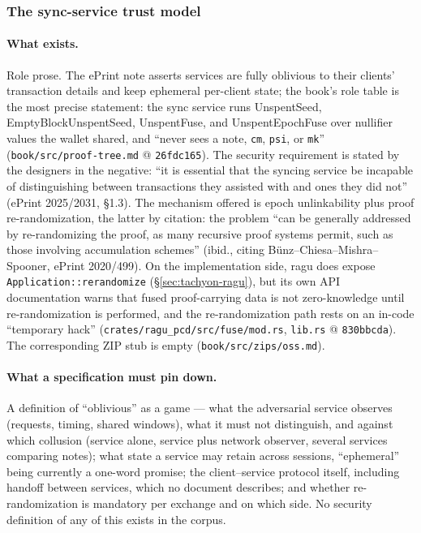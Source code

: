\documentclass[11pt,a4paper]{article}
\theoremstyle{definition}
\begin{document}
\subsubsection{The sync-service trust model}\label{sec:tachyon-dbu-oss}

\paragraph{What exists.} Role prose. The ePrint note asserts services are
fully oblivious to their clients' transaction details and keep ephemeral
per-client state; the book's role table is the most precise statement: the
sync service runs \textsf{UnspentSeed}, \textsf{EmptyBlockUnspentSeed},
\textsf{UnspentFuse}, and \textsf{UnspentEpochFuse} over nullifier values
the wallet shared, and ``never sees a note, \texttt{cm}, \texttt{psi}, or
\texttt{mk}'' (\texttt{book/src/proof-tree.md} @ \texttt{26fdc165}). The
security requirement is stated by the designers in the negative: ``it is
essential that the syncing service be incapable of distinguishing between
transactions they assisted with and ones they did not'' (ePrint 2025/2031,
\S1.3). The mechanism offered is epoch unlinkability plus proof
re-randomization, the latter by citation: the problem ``can be generally
addressed by re-randomizing the proof, as many recursive proof systems
permit, such as those involving accumulation schemes'' (ibid., citing
B\"unz--Chiesa--Mishra--Spooner, ePrint 2020/499). On the implementation
side, \textsf{ragu} does expose \texttt{Application::rerandomize}
(\S\ref{sec:tachyon-ragu}), but its own API documentation warns that fused
proof-carrying data is not zero-knowledge until re-randomization is
performed, and the re-randomization path rests on an in-code ``temporary
hack'' (\texttt{crates/ragu\_pcd/src/fuse/mod.rs}, \texttt{lib.rs} @
\texttt{830bbcda}). The corresponding ZIP stub is empty
(\texttt{book/src/zips/oss.md}).

\paragraph{What a specification must pin down.} A definition of
``oblivious'' as a game --- what the adversarial service observes (requests,
timing, shared windows), what it must not distinguish, and against which
collusion (service alone, service plus network observer, several services
comparing notes); what state a service may retain across sessions,
``ephemeral'' being currently a one-word promise; the client--service
protocol itself, including handoff between services, which no document
describes; and whether re-randomization is mandatory per exchange and on
which side. No security definition of any of this exists in the corpus.
\end{document}
